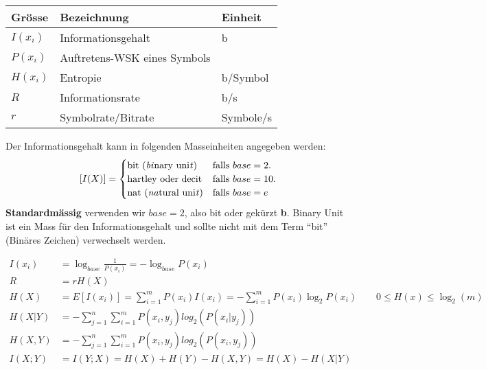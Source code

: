 \begin{multicols}{2}
\renewcommand{\arraystretch}{\arraystretchOriginal}
\begin{tabular}{|l|l|l|}
	\hline
	\textbf{Grösse}	& \textbf{Bezeichnung}	& \textbf{Einheit} \\ 
	\hline
	$I(x_i)$ 	& Informationsgehalt 	& b \\
	\hline
	$P(x_i)$	& Auftretens-WSK eines Symbols & \\
	\hline
	$H(x_i)$	& Entropie				& b/Symbol\\
	\hline
	$R$			& Informationsrate 		& b/s \\
	\hline
	$r$			& Symbolrate/Bitrate	& Symbole/s	 \\
	\hline
\end{tabular}

Der Informationsgehalt kann in folgenden Masseinheiten angegeben werden:
\[ [I(X)] = \begin{cases}
            	\text{bit (\emph{bi}nary uni\emph{t})} 
            		& \text{falls } base=2. \\
            	\text{hartley oder decit}
            		& \text{falls } base=10. \\
            	\text{nat (\emph{na}tural uni\emph{t})} 
            		& \text{falls } base=e
			\end{cases} 
\]
\textbf{Standardmässig} verwenden wir $base=2$, also bit oder gekürzt
\textbf{b}. Binary Unit ist ein Mass für den Informationsgehalt und sollte nicht mit dem Term ``bit'' (Binäres Zeichen) verwechselt
werden.
\end{multicols}

\begin{align*}
	I(x_i)	&= \log_{base} \frac{1}{P(x_i)} = - \log_{base} P(x_i) \\
	R		&= r H (X) \\
	H(X)	&= E[I(x_i)] = \sum\limits_{i=1}^m P(x_i) I(x_i) = - \sum\limits_{i=1}^m P(x_i) \log_2{P(x_i)} \qquad 0 \leq H(x) \leq \log_2(m) \\
	H(X|Y)	&=- \sum\limits_{j=1}^{n} \sum\limits_{i=1}^{m} P(x_i,y_j) log_2(P(x_i|y_j)) \\
	H(X,Y)	&=- \sum\limits_{j=1}^{n} \sum\limits_{i=1}^{m} P(x_i,y_j) log_2(P(x_i,y_j)) \\
	I(X;Y)	&=I(Y;X)=H(X)+H(Y)-H(X,Y)=H(X)-H(X|Y) 
\end{align*}



\begin{minipage}[c]{13cm}

\end{minipage}


